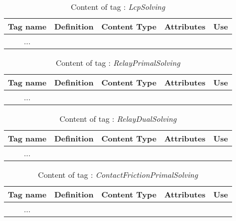 \begin{table}[!hbp]
\begin{center}
\begin{tabular}{|c|p{4cm}|p{2cm}|p{5cm}|p{2cm}|}
\hline
\bf{Tag name} & \bf{Definition} & \bf{Content Type} & \bf{Attributes} & \bf{Use}
\\\hline
\hline
... &  &  &  &  \\
\hline
\end{tabular}
\end{center}
\caption{Content of tag : \textit{LcpSolving}}
\label{tab-LcpSolvingTag}
\end{table}

\begin{table}[!hbp]
\begin{center}
\begin{tabular}{|c|p{4cm}|p{2cm}|p{5cm}|p{2cm}|}
\hline
\bf{Tag name} & \bf{Definition} & \bf{Content Type} & \bf{Attributes} & \bf{Use}
\\\hline
\hline
... &  &  &  &  \\
\hline
\end{tabular}
\end{center}
\caption{Content of tag : \textit{RelayPrimalSolving}}
\label{tab-RelayPSolvingTag}
\end{table}

\begin{table}[!hbp]
\begin{center}
\begin{tabular}{|c|p{4cm}|p{2cm}|p{5cm}|p{2cm}|}
\hline
\bf{Tag name} & \bf{Definition} & \bf{Content Type} & \bf{Attributes} & \bf{Use}
\\\hline
\hline
... &  &  &  &  \\
\hline
\end{tabular}
\end{center}
\caption{Content of tag : \textit{RelayDualSolving}}
\label{tab-RelayDSolvingTag}
\end{table}

\begin{table}[!hbp]
\begin{center}
\begin{tabular}{|c|p{4cm}|p{2cm}|p{5cm}|p{2cm}|}
\hline
\bf{Tag name} & \bf{Definition} & \bf{Content Type} & \bf{Attributes} & \bf{Use}
\\\hline
\hline
... &  &  &  &  \\
\hline
\end{tabular}
\end{center}
\caption{Content of tag : \textit{ContactFrictionPrimalSolving}}
\label{tab-CFPSolvingTag}
\end{table}

